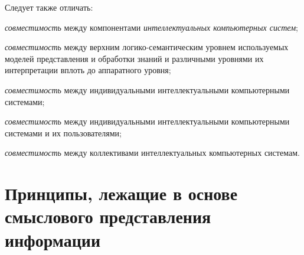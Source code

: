 Следует также отличать:

\begin{textitemize}
	\item
	\textit{совместимость} между компонентами \textit{интеллектуальных компьютерных систем};
	\item
	\textit{совместимость} между верхним логико-семантическим уровнем используемых моделей представления и обработки знаний и различными уровнями их интерпретации вплоть до аппаратного уровня;
	\item
	\textit{совместимость} между индивидуальными интеллектуальными компьютерными системами;
	\item
	\textit{совместимость} между индивидуальными интеллектуальными компьютерными системами и их пользователями;
	\item
	\textit{совместимость} между коллективами интеллектуальных компьютерных системам.
\end{textitemize}

\section{Принципы, лежащие в основе смыслового представления информации}

